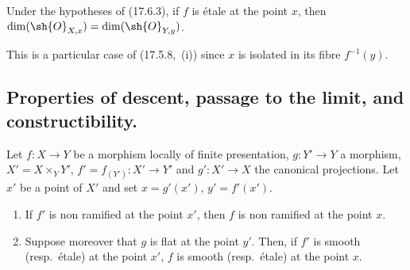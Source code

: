 \begin{proposition}[17.6.4]
\label{IV.17.6.4}
Under the hypotheses of (17.6.3), if $f$ is \'etale at the point $x$, then $\dim(\sh{O}_{X,x})=\dim(\sh{O}_{Y,y})$.
\end{proposition}

This is a particular case of (17.5.8,~(i)) since $x$ is isolated in its fibre $f^{-1}(y)$.


\subsection{Properties of descent, passage to the limit, and constructibility.}
\label{subsection:IV.17.7}
\label{IV.17.7}


\begin{proposition}[17.7.1]
\label{IV.17.7.1}
Let $f:X\to Y$ be a morphism locally of finite presentation, $g:Y'\to Y$ a morphism, $X'=X\times_Y Y'$, $f'=f_{(Y')}:X'\to Y'$ and $g':X'\to X$ the canonical projections.
Let $x'$ be a point of $X'$ and set $x=g'(x')$, $y'=f'(x')$.
\begin{enumerate}[label=(\roman*)]
  \item If $f'$ is non ramified at the point $x'$, then $f$ is non ramified at the point $x$.
  \item Suppose moreover that $g$ is flat at the point $y'$.
  Then, if $f'$ is smooth (resp.\ \'etale) at the point $x'$, $f$ is smooth (resp.\ \'etale) at the point $x$.
\end{enumerate}
\end{proposition}

